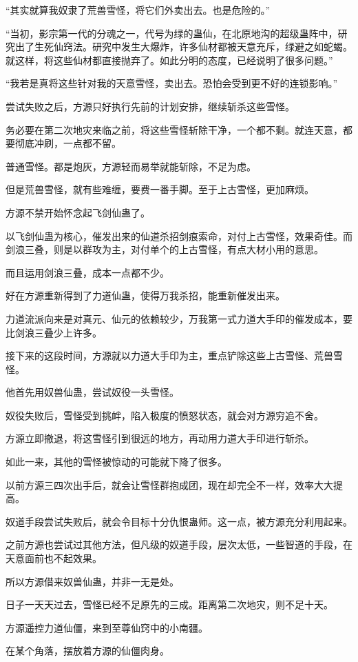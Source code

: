 \begin{this_body}
“其实就算我奴隶了荒兽雪怪，将它们外卖出去。也是危险的。”

“当初，影宗第一代的分魂之一，代号为绿的蛊仙，在北原地沟的超级蛊阵中，研究出了生死仙窍法。研究中发生大爆炸，许多仙材都被天意充斥，绿避之如蛇蝎。就这样，将这些仙材都直接抛弃了。如此分明的态度，已经说明了很多问题。”

“我若是真将这些针对我的天意雪怪，卖出去。恐怕会受到更不好的连锁影响。”

尝试失败之后，方源只好执行先前的计划安排，继续斩杀这些雪怪。

务必要在第二次地灾来临之前，将这些雪怪斩除干净，一个都不剩。就连天意，都要彻底冲刷，一点都不留。

普通雪怪。都是炮灰，方源轻而易举就能斩除，不足为虑。

但是荒兽雪怪，就有些难缠，要费一番手脚。至于上古雪怪，更加麻烦。

方源不禁开始怀念起飞剑仙蛊了。

以飞剑仙蛊为核心，催发出来的仙道杀招剑痕索命，对付上古雪怪，效果奇佳。而剑浪三叠，则是以群攻为主，对付单个的上古雪怪，有点大材小用的意思。

而且运用剑浪三叠，成本一点都不少。

好在方源重新得到了力道仙蛊，使得万我杀招，能重新催发出来。

力道流派向来是对真元、仙元的依赖较少，万我第一式力道大手印的催发成本，要比剑浪三叠少上许多。

接下来的这段时间，方源就以力道大手印为主，重点铲除这些上古雪怪、荒兽雪怪。

他首先用奴兽仙蛊，尝试奴役一头雪怪。

奴役失败后，雪怪受到挑衅，陷入极度的愤怒状态，就会对方源穷追不舍。

方源立即撤退，将这雪怪引到很远的地方，再动用力道大手印进行斩杀。

如此一来，其他的雪怪被惊动的可能就下降了很多。

以前方源三四次出手后，就会让雪怪群抱成团，现在却完全不一样，效率大大提高。

奴道手段尝试失败后，就会令目标十分仇恨蛊师。这一点，被方源充分利用起来。

之前方源也尝试过其他方法，但凡级的奴道手段，层次太低，一些智道的手段，在天意面前也不起效果。

所以方源借来奴兽仙蛊，并非一无是处。

日子一天天过去，雪怪已经不足原先的三成。距离第二次地灾，则不足十天。

方源遥控力道仙僵，来到至尊仙窍中的小南疆。

在某个角落，摆放着方源的仙僵肉身。


\end{this_body}
